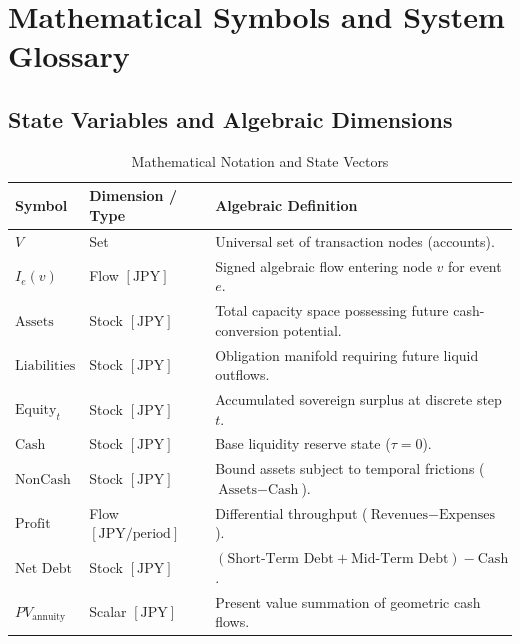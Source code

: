 \else
\appendix
\chapter{Mathematical Symbols and System Glossary}
\label{chap:symbols_and_glossary}

\section{State Variables and Algebraic Dimensions}
\begin{table}[htbp]
\centering
\small
\begin{tabular}{llp{9.5cm}}
\toprule
\textbf{Symbol} & \textbf{Dimension / Type} & \textbf{Algebraic Definition} \\
\midrule
$V$ & Set & Universal set of transaction nodes (accounts). \\
$I_e(v)$ & Flow $[\text{JPY}]$ & Signed algebraic flow entering node $v$ for event $e$. \\
$\text{Assets}$ & Stock $[\text{JPY}]$ & Total capacity space possessing future cash-conversion potential. \\
$\text{Liabilities}$ & Stock $[\text{JPY}]$ & Obligation manifold requiring future liquid outflows. \\
$\text{Equity}_t$ & Stock $[\text{JPY}]$ & Accumulated sovereign surplus at discrete step $t$. \\
$\text{Cash}$ & Stock $[\text{JPY}]$ & Base liquidity reserve state ($\tau = 0$). \\
$\text{NonCash}$ & Stock $[\text{JPY}]$ & Bound assets subject to temporal frictions ($\text{Assets} - \text{Cash}$). \\
$\text{Profit}$ & Flow $[\text{JPY}/\text{period}]$ & Differential throughput ($\text{Revenues} - \text{Expenses}$). \\
$\text{Net Debt}$ & Stock $[\text{JPY}]$ & $(\text{Short-Term Debt} + \text{Mid-Term Debt}) - \text{Cash}$. \\
$PV_{\text{annuity}}$ & Scalar $[\text{JPY}]$ & Present value summation of geometric cash flows. \\
\bottomrule
\end{tabular}
\caption{Mathematical Notation and State Vectors}
\end{table}

